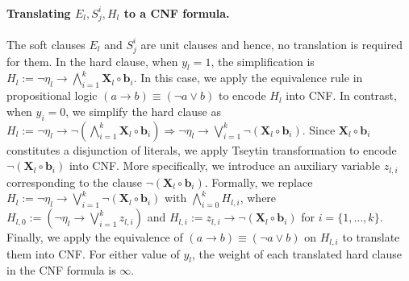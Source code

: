 \paragraph{Translating $ E_l, S^i_j, H_l $ to a CNF formula.} 
The soft clauses $ E_l $ and $ S_j^i $ are unit clauses and hence, no translation is required for them.  In the hard clause, when $ y_l=1 $, the simplification is $ H_l:= \neg \eta_l \rightarrow \bigwedge_{i=1}^k {\mathbf{X}_l} \circ {\mathbf{b}_{i}}  $. In this case, we apply the equivalence rule in propositional logic $ (a \rightarrow b) \equiv (\neg a \vee b) $  to encode $ H_l $ into  CNF. In contrast, when $ y_i=0 $, we simplify the hard clause as $ H_l:= \neg \eta_l \rightarrow \neg (\bigwedge_{i=1}^k {\mathbf{X}_l} \circ {\mathbf{b}_{i}}) \Rightarrow  \neg \eta_l \rightarrow \bigvee_{i=1}^k \neg({\mathbf{X}_l} \circ {\mathbf{b}_{i}})$. Since $ \mathbf{X}_l \circ \mathbf{b}_{i} $ constitutes a disjunction of literals, we apply Tseytin transformation to encode  $ \neg (\mathbf{X}_l \circ \mathbf{b}_{i}) $ into CNF. More specifically, we introduce an auxiliary variable $ z_{l,i} $ corresponding to the clause $ \neg ({\mathbf{X}_l} \circ {\mathbf{b}_{i}}) $. Formally, we replace $ H_l := \neg \eta_l \rightarrow  \bigvee_{i=1}^k \neg ({\mathbf{X}_l} \circ {\mathbf{b}_{i}}) $ with   $ \bigwedge_{i=0}^k H_{l,i} $,  where $ H_{l,0}:= (\neg \eta_l \rightarrow  \bigvee_{i=1}^k  z_{l,i}) $  and  $  H_{l,i}:= z_{l,i} \rightarrow  \neg({\mathbf{X}_l} \circ {\mathbf{b}_{i}})  $ for $ i=\{1,\dots,k\} $. Finally, we  apply the equivalence of $ (a \rightarrow b) \equiv (\neg a \vee b) $ on $ H_{l,i} $ to translate them into CNF. For either value of $ y_l $, the weight of each translated hard clause in the CNF formula is $ \infty $.







